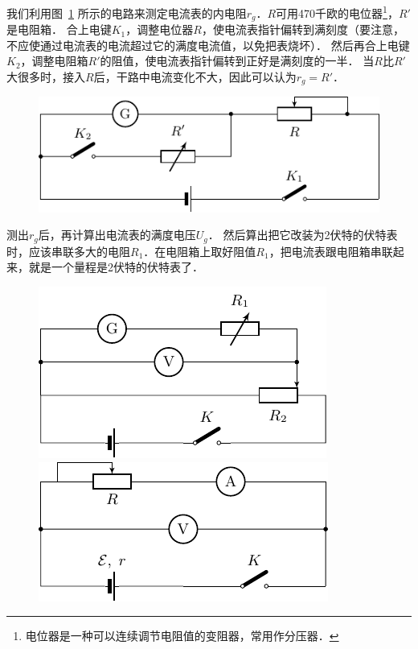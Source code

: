 我们利用图~\ref{fig_B_9-7} 所示的电路来测定电流表的内电阻$r_g$．$R$可用470千欧的电位器\footnote{电位器是一种可以连续调节电阻值的变阻器，常用作分压器．}，$R'$是电阻箱．
合上电键$K_{1}$，调整电位器$R$，使电流表指针偏转到满刻度（要注意，不应使通过电流表的电流超过它的满度电流值，以免把表烧坏）．
然后再合上电键$K_2$，调整电阻箱$R'$的阻值，使电流表指针偏转到正好是满刻度的一半．
当$R$比$R'$大很多时，接入$R$后，干路中电流变化不大，因此可以认为$r_g=R'$．

\begin{figure}[htbp]
	\centering
	\includegraphics{fig/B/9-7.pdf}
	\caption{}\label{fig_B_9-7}
\end{figure}

测出$r_g$后，再计算出电流表的满度电压$U_g$．
然后算出把它改装为2伏特的伏特表时，应该串联多大的电阻$R_1$．在电阻箱上取好阻值$R_1$，把电流表跟电阻箱串联起来，就是一个量程是2伏特的伏特表了．
\begin{figure}[htbp]
    \centering
    \begin{minipage}[t]{0.48\textwidth}
        \centering
        \includegraphics{fig/B/9-8.pdf}
        \caption{}\label{fig_B_9-8}
    \end{minipage}
    \begin{minipage}[t]{0.48\textwidth}
        \centering
        \includegraphics{fig/B/9-9.pdf}
        \caption{}\label{fig_B_9-9}
    \end{minipage}
\end{figure}
    

